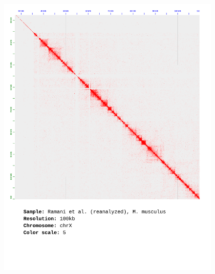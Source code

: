 \documentclass[a4paper,14pt]{extarticle}
\begin{document}
\begin{figure}[hp!] \includegraphics[width=1\textwidth]{ramani-brain_chrX_100kb_5.pdf} \end{figure}
\end{document}
